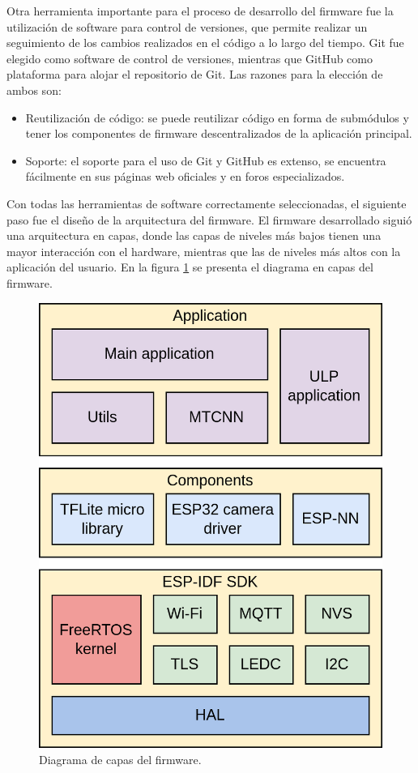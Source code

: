 Otra herramienta importante para el proceso de desarrollo del firmware fue la utilización de software para control de versiones, que permite realizar un seguimiento de los cambios realizados en el código a lo largo del tiempo. Git fue elegido como software de control de versiones, mientras que GitHub como plataforma para alojar el repositorio de Git. Las razones para la elección de ambos son:
\begin{itemize}
	\item Reutilización de código: se puede reutilizar código en forma de submódulos y tener los componentes de firmware descentralizados de la aplicación principal.
	\item Soporte: el soporte para el uso de Git y GitHub es extenso, se encuentra fácilmente en sus páginas web oficiales y en foros especializados.
\end{itemize}

Con todas las herramientas de software correctamente seleccionadas, el siguiente paso fue el diseño de la arquitectura del firmware. El firmware desarrollado siguió una arquitectura en capas, donde las capas de niveles más bajos tienen una mayor interacción con el hardware, mientras que las de niveles más altos con la aplicación del usuario. En la figura \ref{fig:fw_layers} se presenta el diagrama en capas del firmware.

\begin{figure}[h]
	\centering
	\includegraphics[scale=0.2]{./Figures/fw_layers.png}
	\caption{Diagrama de capas del firmware.}
	\label{fig:fw_layers}
\end{figure}


